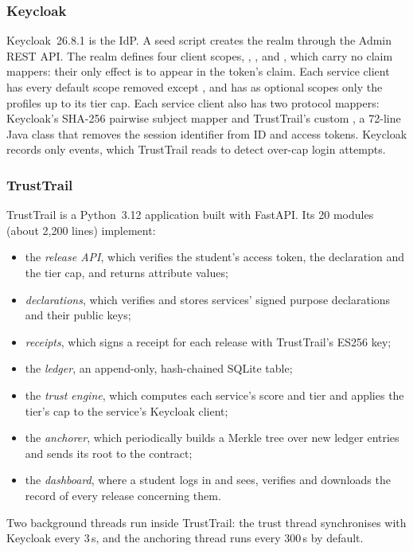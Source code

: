 \subsubsection{Keycloak}
Keycloak~26.8.1 is the IdP. A seed script creates the realm  through the Admin REST API. The realm defines four client scopes, , ,  and , which carry no claim mappers: their only effect is to appear in the token's  claim. Each service client has every default scope removed except , and has as optional scopes only the profiles up to its tier cap. Each service client also has two protocol mappers: Keycloak's SHA-256 pairwise subject mapper and TrustTrail's custom , a 72-line Java class that removes the session identifier from ID and access tokens. Keycloak records only  events, which TrustTrail reads to detect over-cap login attempts.

\subsubsection{TrustTrail}
TrustTrail is a Python~3.12 application built with FastAPI. Its 20 modules (about 2{,}200 lines) implement:
\begin{itemize}
\item the \emph{release API}, which verifies the student's access token, the declaration and the tier cap, and returns attribute values;
\item \emph{declarations}, which verifies and stores services' signed purpose declarations and their public keys;
\item \emph{receipts}, which signs a receipt for each release with TrustTrail's ES256 key;
\item the \emph{ledger}, an append-only, hash-chained SQLite table;
\item the \emph{trust engine}, which computes each service's score and tier and applies the tier's cap to the service's Keycloak client;
\item the \emph{anchorer}, which periodically builds a Merkle tree over new ledger entries and sends its root to the contract;
\item the \emph{dashboard}, where a student logs in and sees, verifies and downloads the record of every release concerning them.
\end{itemize}
Two background threads run inside TrustTrail: the trust thread synchronises with Keycloak every 3\,s, and the anchoring thread runs every 300\,s by default.

